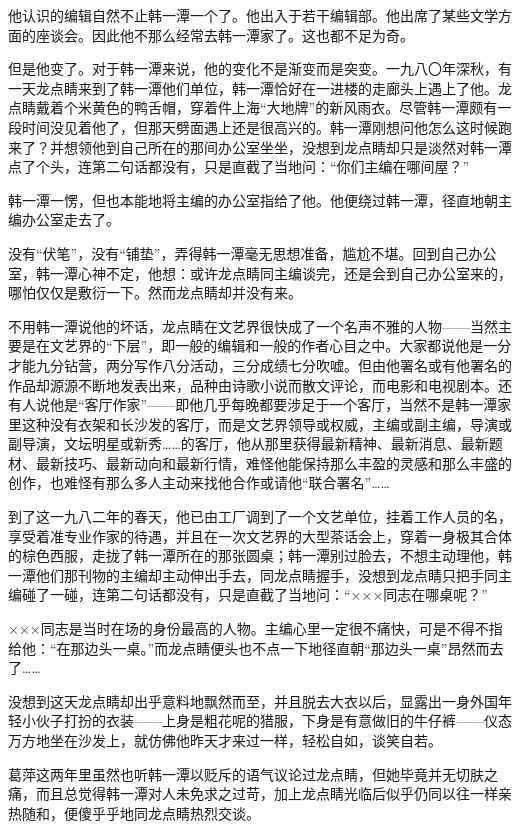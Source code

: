 \par 他认识的编辑自然不止韩一潭一个了。他出入于若干编辑部。他出席了某些文学方面的座谈会。因此他不那么经常去韩一潭家了。这也都不足为奇。
\par 但是他变了。对于韩一潭来说，他的变化不是渐变而是突变。一九八〇年深秋，有一天龙点睛来到了韩一潭他们单位，韩一潭恰好在一进楼的走廊头上遇上了他。龙点睛戴着个米黄色的鸭舌帽，穿着件上海“大地牌”的新风雨衣。尽管韩一潭颇有一段时间没见着他了，但那天劈面遇上还是很高兴的。韩一潭刚想问他怎么这时候跑来了？并想领他到自己所在的那间办公室坐坐，没想到龙点睛却只是淡然对韩一潭点了个头，连第二句话都没有，只是直截了当地问：“你们主编在哪间屋？”
\par 韩一潭一愣，但也本能地将主编的办公室指给了他。他便绕过韩一潭，径直地朝主编办公室走去了。
\par 没有“伏笔”，没有“铺垫”，弄得韩一潭毫无思想准备，尴尬不堪。回到自己办公室，韩一潭心神不定，他想：或许龙点睛同主编谈完，还是会到自己办公室来的，哪怕仅仅是敷衍一下。然而龙点睛却并没有来。
\par 不用韩一潭说他的坏话，龙点睛在文艺界很快成了一个名声不雅的人物——当然主要是在文艺界的“下层”，即一般的编辑和一般的作者心目之中。大家都说他是一分才能九分钻营，两分写作八分活动，三分成绩七分吹嘘。但由他署名或有他署名的作品却源源不断地发表出来，品种由诗歌小说而散文评论，而电影和电视剧本。还有人说他是“客厅作家”——即他几乎每晚都要涉足于一个客厅，当然不是韩一潭家里这种没有衣架和长沙发的客厅，而是文艺界领导或权威，主编或副主编，导演或副导演，文坛明星或新秀……的客厅，他从那里获得最新精神、最新消息、最新题材、最新技巧、最新动向和最新行情，难怪他能保持那么丰盈的灵感和那么丰盛的创作，也难怪有那么多人主动来找他合作或请他“联合署名”……
\par 到了这一九八二年的春天，他已由工厂调到了一个文艺单位，挂着工作人员的名，享受着准专业作家的待遇，并且在一次文艺界的大型茶话会上，穿着一身极其合体的棕色西服，走拢了韩一潭所在的那张圆桌；韩一潭别过脸去，不想主动理他，韩一潭他们那刊物的主编却主动伸出手去，同龙点睛握手，没想到龙点睛只把手同主编碰了一碰，连第二句话都没有，只是直截了当地问：“×××同志在哪桌呢？”
\par ×××同志是当时在场的身份最高的人物。主编心里一定很不痛快，可是不得不指给他：“在那边头一桌。”而龙点睛便头也不点一下地径直朝“那边头一桌”昂然而去了……
\par 没想到这天龙点睛却出乎意料地飘然而至，并且脱去大衣以后，显露出一身外国年轻小伙子打扮的衣装——上身是粗花呢的猎服，下身是有意做旧的牛仔裤——仪态万方地坐在沙发上，就仿佛他昨天才来过一样，轻松自如，谈笑自若。
\par 葛萍这两年里虽然也听韩一潭以贬斥的语气议论过龙点睛，但她毕竟并无切肤之痛，而且总觉得韩一潭对人未免求之过苛，加上龙点睛光临后似乎仍同以往一样亲热随和，便傻乎乎地同龙点睛热烈交谈。
